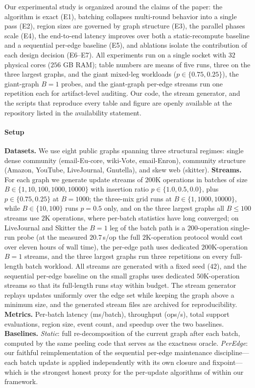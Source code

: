 \label{sec:experiments}

Our experimental study is organized around the claims of the paper: the algorithm is exact (E1), batching collapses multi-round behavior into a single pass (E2), region sizes are governed by graph structure (E3), the parallel phases scale (E4), the end-to-end latency improves over both a static-recompute baseline and a sequential per-edge baseline (E5), and ablations isolate the contribution of each design decision (E6--E7).
All experiments run on a single socket with $32$ physical cores ($256$ GB RAM); table numbers are means of five runs, three on the three largest graphs, and the giant mixed-leg workloads ($p\in\{0.75,0.25\}$), the giant-graph $B{=}1$ probes, and the giant-graph per-edge streams run one repetition each for artifact-level auditing.
Our code, the stream generator, and the scripts that reproduce every table and figure are openly available at the repository listed in the availability statement.

\paragraph{Setup}
\label{par:setup}
\textbf{Datasets.}
We use eight public graphs spanning three structural regimes: single dense community (email-Eu-core, wiki-Vote, email-Enron), community structure (Amazon, YouTube, LiveJournal, Gnutella), and skew web (skitter).
\textbf{Streams.}
For each graph we generate update streams of $200$K operations in batches of size $B\in\{1,10,100,1000,10000\}$ with insertion ratio $p\in\{1.0, 0.5, 0.0\}$, plus $p\in\{0.75, 0.25\}$ at $B{=}1000$; the three-mix grid runs at $B\in\{1, 1000, 10000\}$, while $B\in\{10, 100\}$ runs $p{=}0.5$ only, and on the three largest graphs all $B\le 100$ streams use $2$K operations, where per-batch statistics have long converged; on LiveJournal and Skitter the $B{=}1$ leg of the batch path is a $200$-operation single-run probe (at the measured $20.7$\,s/op the full $2$K-operation protocol would cost over eleven hours of wall time), the per-edge path uses dedicated $200$K-operation $B{=}1$ streams, and the three largest graphs run three repetitions on every full-length batch workload.
All streams are generated with a fixed seed ($42$), and the sequential per-edge baseline on the small graphs uses dedicated $50$K-operation streams so that its full-length runs stay within budget.
The stream generator replays updates uniformly over the edge set while keeping the graph above a minimum size, and the generated stream files are archived for reproducibility.
\textbf{Metrics.}
Per-batch latency (ms/batch), throughput (ops/s), total support evaluations, region size, event count, and speedup over the two baselines.
\textbf{Baselines.}
\emph{Static}: full re-decomposition of the current graph after each batch, computed by the same peeling code that serves as the exactness oracle.
\emph{PerEdge}: our faithful reimplementation of the sequential per-edge maintenance discipline---each batch update is applied independently with its own closure and fixpoint---which is the strongest honest proxy for the per-update algorithms of  within our framework.


